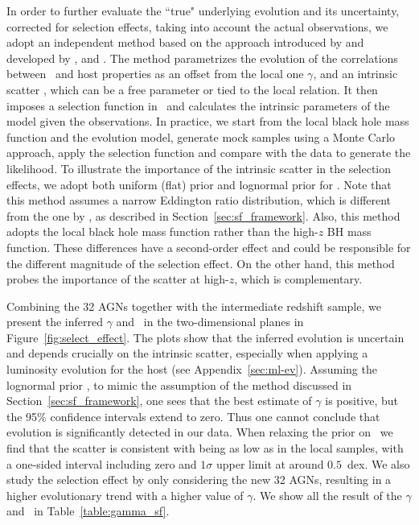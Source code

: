 \documentclass[apj]{emulateapj}
\begin{document}
In order to further evaluate the ``true" underlying evolution and its uncertainty, corrected for selection effects, taking into account the actual observations, we adopt an independent method based on the approach introduced by \citet{Tre++07} and developed by \citet{Ben++10}, \citet{Park15} and \citet{Ding2017b}. The method parametrizes the evolution of the correlations between \mbh\ and host properties as an offset from the local one $\gamma$, and an intrinsic scatter \sint, which can be a free parameter or tied to the local relation. It then imposes a selection function in \mbh\ and calculates the intrinsic parameters of the model given the observations. In practice, we start from the local black hole mass function and the evolution model, generate mock samples using a Monte Carlo approach, apply the selection function and compare with the data to generate the likelihood. To illustrate the importance of the intrinsic scatter in the selection effects, we adopt both uniform (flat) prior and lognormal prior for \sint. 
Note that this method assumes a narrow Eddington ratio distribution, which is different from the one by \citet{Schulze2011}, as described in Section~\ref{sec:sf_framework}. Also, this method adopts the local black hole mass function rather than the high-$z$ BH mass function. These differences have a second-order effect and could be responsible for the different magnitude of the selection effect. On the other hand, this method probes the importance of the scatter at high-$z$, which is complementary. 

Combining the 32 AGNs together with the intermediate redshift sample, we present the inferred  $\gamma$ and \sint\ in the two-dimensional planes in Figure~\ref{fig:select_effect}. The plots show that the inferred evolution is uncertain and depends crucially on the intrinsic scatter, especially when applying a luminosity evolution for the host (see Appendix~\ref{sec:ml-ev}). Assuming the lognormal prior \sint, to mimic the assumption of the method discussed in Section~\ref{sec:sf_framework}, one sees that the best estimate of $\gamma$ is positive, but the 95\% confidence intervals extend to zero. Thus one cannot conclude that evolution is significantly detected in our data. 
When relaxing the prior on \sint\ we find that the scatter is consistent with being as low as in the local samples, with a one-sided interval including zero and $1\sigma$ upper limit at around $0.5$~dex. 
We also study the selection effect by only considering the new 32 AGNs, resulting in a higher evolutionary trend with a higher value of $\gamma$. We show all the result of the $\gamma$ and \sint\ in Table~\ref{table:gamma_sf}.
\end{document}
